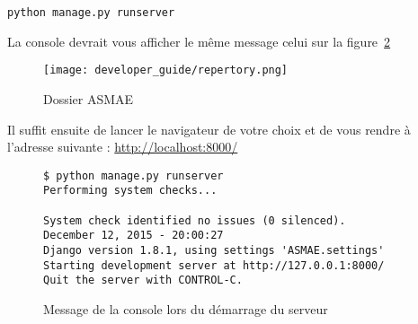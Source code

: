 \verb#python manage.py runserver#
\bigskip

La console devrait vous afficher le même message celui sur la
figure~\ref{fig:Message de la console lors du démarrage du serveur}

\begin{figure}[!ht]
    \centering
    \texttt{[image: developer\_guide/repertory.png]}
    \caption{Dossier ASMAE}
    \label{fig:Dossier ASMAE}
\end{figure}
\FloatBarrier

Il suffit ensuite de lancer le navigateur de votre choix et de vous rendre à
l’adresse suivante : \url{http://localhost:8000/}

\begin{figure}[!ht]
\begin{framed}
\begin{verbatim}
$ python manage.py runserver
Performing system checks...

System check identified no issues (0 silenced).
December 12, 2015 - 20:00:27
Django version 1.8.1, using settings 'ASMAE.settings'
Starting development server at http://127.0.0.1:8000/
Quit the server with CONTROL-C.
\end{verbatim}
\end{framed}
\caption{Message de la console lors du démarrage du serveur}
\label{fig:Message de la console lors du démarrage du serveur}
\end{figure}
\FloatBarrier

